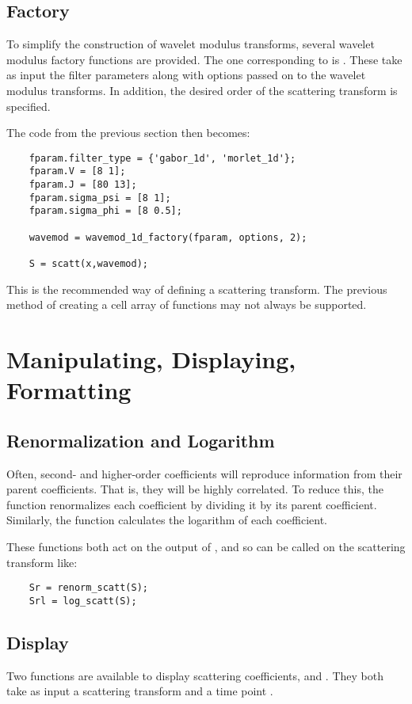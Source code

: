 \documentclass[twocolumn]{article}
\begin{document}
\subsection{ Factory}
To simplify the construction of wavelet modulus transforms, several wavelet modulus factory functions are provided. The one corresponding to  is . These take as input the filter parameters along with options passed on to the wavelet modulus transforms. In addition, the desired order  of the scattering transform is specified.

The code from the previous section then becomes:
\begin{lstlisting}
	fparam.filter_type = {'gabor_1d', 'morlet_1d'};
	fparam.V = [8 1];
	fparam.J = [80 13];
	fparam.sigma_psi = [8 1];
	fparam.sigma_phi = [8 0.5];
	
	wavemod = wavemod_1d_factory(fparam, options, 2);
	
	S = scatt(x,wavemod);
\end{lstlisting}

This is the recommended way of defining a scattering transform. The previous method of creating a cell array of  functions may not always be supported.

\section{Manipulating, Displaying, Formatting}

\subsection{Renormalization and Logarithm}
Often, second- and higher-order coefficients will reproduce information from their parent coefficients. That is, they will be highly correlated. To reduce this, the  function renormalizes each coefficient by dividing it by its parent coefficient. Similarly, the  function calculates the logarithm of each coefficient.

These functions both act on the output of , and so can be called on the scattering transform  like:
\begin{lstlisting}
	Sr = renorm_scatt(S);
	Srl = log_scatt(S);
\end{lstlisting}

\subsection{Display}
Two functions are available to display scattering coefficients,  and . They both take as input a scattering transform  and a time point .
\end{document}
